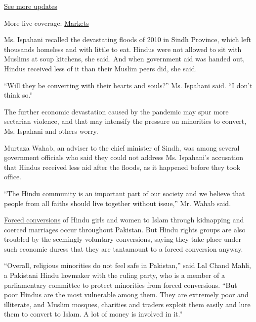 \href{https://www.nytimes3xbfgragh.onion/2020/09/08/world/covid-19-coronavirus.html?action=click\&pgtype=Article\&state=default\&region=MAIN_CONTENT_1\&context=storylines_live_updates}{See
more updates}

More live coverage:
\href{https://www.nytimes3xbfgragh.onion/live/2020/09/08/business/stock-market-today-coronavirus?action=click\&pgtype=Article\&state=default\&region=MAIN_CONTENT_1\&context=storylines_live_updates}{Markets}

Ms. Ispahani recalled the devastating floods of 2010 in Sindh Province,
which left thousands homeless and with little to eat. Hindus were not
allowed to sit with Muslims at soup kitchens, she said. And when
government aid was handed out, Hindus received less of it than their
Muslim peers did, she said.

``Will they be converting with their hearts and souls?'' Ms. Ispahani
said. ``I don't think so.''

The further economic devastation caused by the pandemic may spur more
sectarian violence, and that may intensify the pressure on minorities to
convert, Ms. Ispahani and others worry.

Murtaza Wahab, an adviser to the chief minister of Sindh, was among
several government officials who said they could not address Ms.
Ispahani's accusation that Hindus received less aid after the floods, as
it happened before they took office.

``The Hindu community is an important part of our society and we believe
that people from all faiths should live together without issue,'' Mr.
Wahab said.

\href{https://www.nytimes3xbfgragh.onion/2012/03/26/world/asia/pakistani-hindus-say-womans-conversion-to-islam-was-coerced.html}{Forced
conversions} of Hindu girls and women to Islam through kidnapping and
coerced marriages occur throughout Pakistan. But Hindu rights groups are
also troubled by the seemingly voluntary conversions, saying they take
place under such economic duress that they are tantamount to a forced
conversion anyway.

``Overall, religious minorities do not feel safe in Pakistan,'' said Lal
Chand Mahli, a Pakistani Hindu lawmaker with the ruling party, who is a
member of a parliamentary committee to protect minorities from forced
conversions. ``But poor Hindus are the most vulnerable among them. They
are extremely poor and illiterate, and Muslim mosques, charities and
traders exploit them easily and lure them to convert to Islam. A lot of
money is involved in it.''

